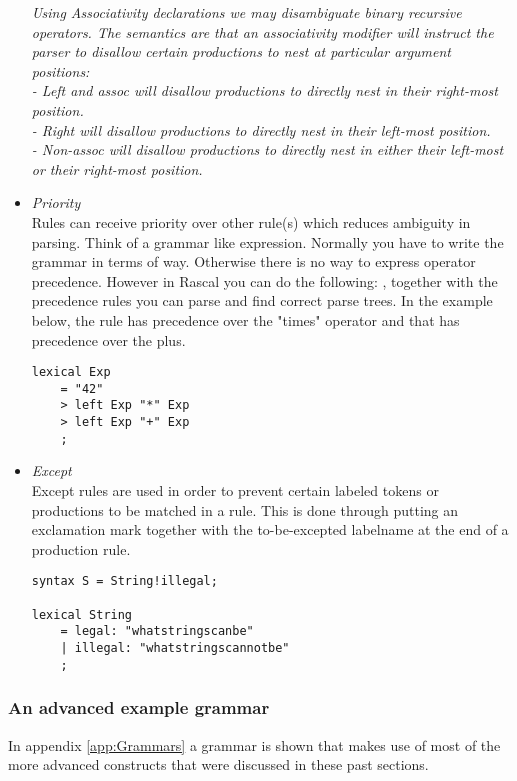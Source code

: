 \begin{itemize}
\begin{flushleft}\textit{
Using Associativity declarations we may disambiguate binary recursive operators. The semantics are that an associativity modifier will instruct the parser to disallow certain productions to nest at particular argument positions:
\\\indent - Left and assoc will disallow productions to directly nest in their right-most position.
\\\indent - Right will disallow productions to directly nest in their left-most position.
\\\indent - Non-assoc will disallow productions to directly nest in either their left-most or their right-most position.
}\end{flushleft}
			\item \emph{Priority}\\
			Rules can receive priority over other rule(s) which reduces ambiguity in parsing. Think of a grammar like expression. Normally you have to write the grammar in terms of  way. Otherwise there is no way to express operator precedence. However in Rascal you can do the following: , together with the precedence rules you can parse and find correct parse trees. In the example below, the rule  has precedence over the "times" operator and that has precedence over the plus.
\begin{lstlisting}[language=RascalGrammar]
lexical Exp
	= "42"
	> left Exp "*" Exp
	> left Exp "+" Exp
	;\end{lstlisting}		
	
	\item \emph{Except}\\
	Except rules are used in order to prevent certain labeled tokens or productions to be matched in a rule. This is done through putting an exclamation mark together with the to-be-excepted labelname at the end of a production rule.
	\begin{lstlisting}[language=RascalGrammar]
syntax S = String!illegal;

lexical String 
	= legal: "whatstringscanbe"
	| illegal: "whatstringscannotbe"
	;\end{lstlisting}
\end{itemize}

\subsubsection{An advanced example grammar}
In appendix \ref{app:Grammars} a grammar is shown that makes use of most of the more advanced constructs that were discussed in these past sections.

